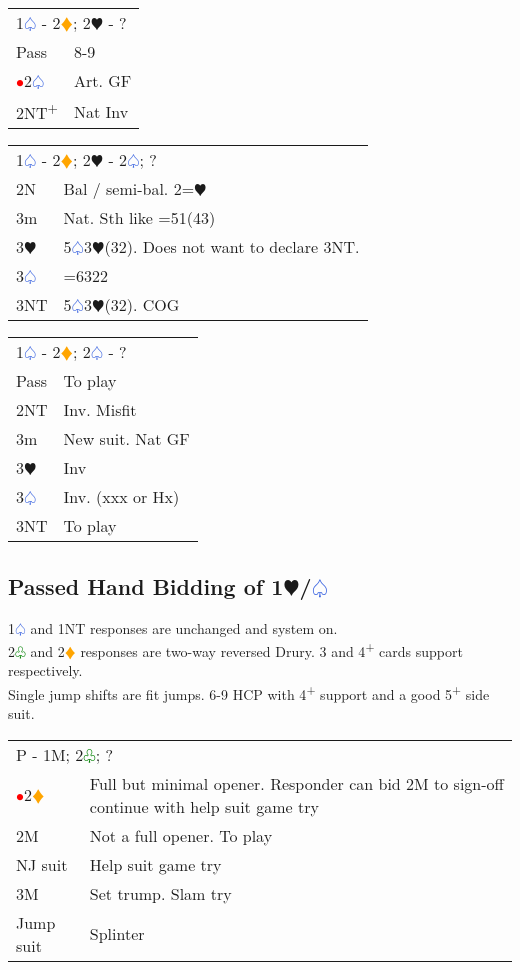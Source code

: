 \documentclass{article}
\renewcommand{\sp}{\textcolor{RoyalBlue}{$\varspade$}}
\newcommand{\he}{\textcolor{RubineRed}{$\varheart$}}
\newcommand{\di}{\textcolor{Orange}{$\vardiamond$}}
\newcommand{\cl}{\textcolor{Green}{$\varclub$}}
\newcommand{\nt}{\relsize{-1}NT\relsize{1}}
\newcommand{\up}{\textsuperscript{+}}
\newcommand{\al}{\textcolor{red}{$\bullet$}}
\begin{document}
\medskip

\begin{tabular}{|l|p{6.5cm}}
	\multicolumn{2}{l}{1\sp{} - 2\di{}; 2\he{} - ? }\\
	Pass & 8-9 \\
	\al{}2\sp{} & Art. GF \\
	2\nt{}\up{} & Nat Inv \\
\end{tabular}

\medskip

\begin{tabular}{|l|p{6.5cm}}
	\multicolumn{2}{l}{1\sp{} - 2\di{}; 2\he{} - 2\sp{}; ? }\\
	2N & Bal / semi-bal. 2=\he{} \\
	3m & Nat. Sth like =51(43) \\
	3\he{} & 5\sp{}3\he{}(32). Does not want to declare 3\nt{}. \\
	3\sp{} & =6322 \\
	3\nt{} & 5\sp{}3\he{}(32). COG \\
\end{tabular}

\medskip

\begin{tabular}{|l|p{6.5cm}}
	\multicolumn{2}{l}{1\sp{} - 2\di{}; 2\sp{} - ? }\\
	Pass & To play \\
	2\nt{} & Inv. Misfit \\
	3m & New suit. Nat GF \\
	3\he{} & Inv \\
	3\sp{} & Inv. (xxx or Hx) \\
	3\nt{} & To play \\
\end{tabular}


\subsection{Passed Hand Bidding of 1\he{}/\sp}
1\sp{} and 1\nt{} responses are unchanged and system on. \\

2\cl{} and 2\di{} responses are two-way reversed Drury. 3 and 4\up{} cards support respectively. \\

Single jump shifts are fit jumps. 6-9 HCP with 4\up{} support and a good 5\up{} side suit. \\

\begin{tabular}{|l|p{6.5cm}}
	\multicolumn{2}{l}{P - 1M; 2\cl{}; ?}\\
	\al{}2\di{} & Full but minimal opener. Responder can bid 2M to sign-off continue with help suit game try \\
	2M & Not a full opener. To play \\
	NJ suit & Help suit game try \\
	3M & Set trump. Slam try \\
	Jump suit & Splinter \\
\end{tabular}
\end{document}
